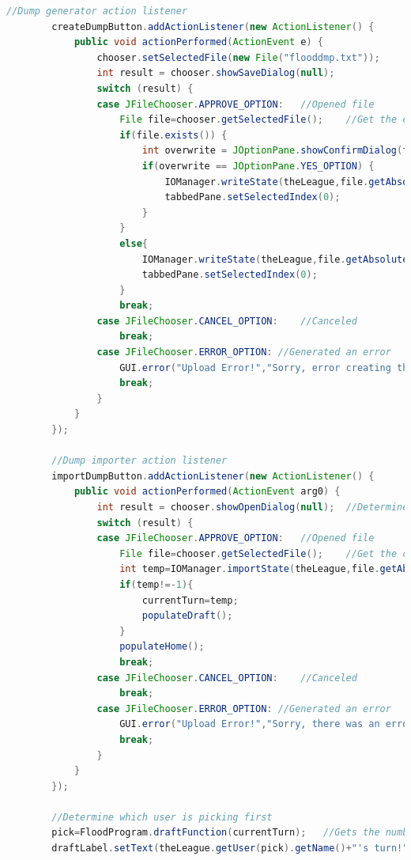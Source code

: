 \documentclass[12pt]{report}
\begin{document}
\begin{singlespace}
\begin{lstlisting}[language=Java,label=some-code,caption={GUI.java}]
		//Dump generator action listener
		createDumpButton.addActionListener(new ActionListener() {
			public void actionPerformed(ActionEvent e) {
				chooser.setSelectedFile(new File("flooddmp.txt"));
				int result = chooser.showSaveDialog(null);
				switch (result) {
				case JFileChooser.APPROVE_OPTION:	//Opened file
					File file=chooser.getSelectedFile();	//Get the chosen file
					if(file.exists()) {
		                int overwrite = JOptionPane.showConfirmDialog(frmFloodFantasyLeague, "Do you want to overwrite " + file.getName());
		                if(overwrite == JOptionPane.YES_OPTION) {
		                	IOManager.writeState(theLeague,file.getAbsolutePath(),currentTurn);	//Pass the file path to the parser method
		                	tabbedPane.setSelectedIndex(0);
		                }
					}
					else{
						IOManager.writeState(theLeague,file.getAbsolutePath(),currentTurn);	//Pass the file path to the parser method
						tabbedPane.setSelectedIndex(0);
					}
					break;
				case JFileChooser.CANCEL_OPTION:	//Canceled
					break;
				case JFileChooser.ERROR_OPTION:	//Generated an error
					GUI.error("Upload Error!","Sorry, error creating the dump file.");
					break;
				}
			}
		});
		
		//Dump importer action listener
		importDumpButton.addActionListener(new ActionListener() {
			public void actionPerformed(ActionEvent arg0) {
				int result = chooser.showOpenDialog(null);	//Determine what the user pressed
				switch (result) {
				case JFileChooser.APPROVE_OPTION:	//Opened file
					File file=chooser.getSelectedFile();	//Get the chosen file
					int temp=IOManager.importState(theLeague,file.getAbsolutePath());	//Pass the file path to the parser method
					if(temp!=-1){
						currentTurn=temp;
						populateDraft();
					}
					populateHome();
					break;
				case JFileChooser.CANCEL_OPTION:	//Canceled
					break;
				case JFileChooser.ERROR_OPTION:	//Generated an error
					GUI.error("Upload Error!","Sorry, there was an error opening the stat file.");
					break;
				}
			}
		});
		
		//Determine which user is picking first
		pick=FloodProgram.draftFunction(currentTurn);	//Gets the number representing the user's turn
		draftLabel.setText(theLeague.getUser(pick).getName()+"'s turn!");	//Puts the user's name in the label 
		

\end{lstlisting}
\end{singlespace}
\end{document}

